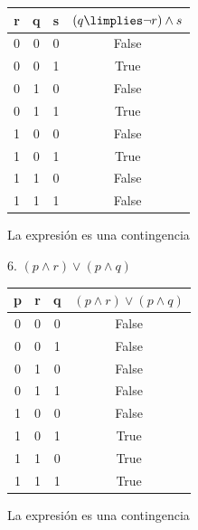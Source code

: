 \documentclass{article}
\begin{document}
\begin{center}
    \begin{tabular}{| c | c | c | c |}
        \hline
        r & q & s & $(q \limplies \lnot r) \land s$ \\
        \hline
        0 & 0 & 0 & False \\
        0 & 0 & 1 & True \\
        0 & 1 & 0 & False \\
        0 & 1 & 1 & True \\
        1 & 0 & 0 & False \\
        1 & 0 & 1 & True \\
        1 & 1 & 0 & False \\
        1 & 1 & 1 & False \\
        \hline
    \end{tabular}

    \bigskip

    La expresión es una contingencia
\end{center}

\newpage

6. $(p \land r) \lor (p \land q)$

\begin{center}
    \begin{tabular}{| c | c | c | c |}
        \hline
        p & r & q & $(p \land r) \lor (p \land q)$ \\
        \hline
        0 & 0 & 0 & False \\
        0 & 0 & 1 & False \\
        0 & 1 & 0 & False \\
        0 & 1 & 1 & False \\
        1 & 0 & 0 & False \\
        1 & 0 & 1 & True \\
        1 & 1 & 0 & True \\
        1 & 1 & 1 & True \\
        \hline
    \end{tabular}

    \bigskip

    La expresión es una contingencia
\end{center}
\end{document}
